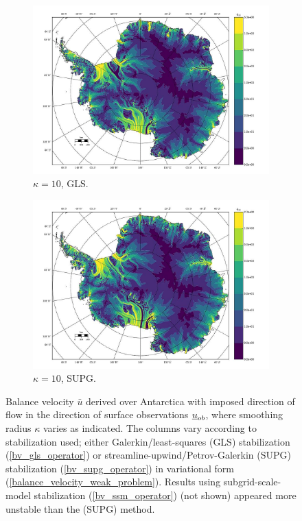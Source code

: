 \begin{figure}
  \begin{subfigure}[b]{0.45\linewidth}
    \includegraphics[width=\linewidth]{images/balance_velocity/antarctica/d_U_ob/Ubar_10H_kappa_10_GLS.jpg}
  \caption{$\kappa = 10$, GLS.}
  \label{antarctica_bv_image_d_U_ob_kappa_10_GLS}
  \end{subfigure}
  \begin{subfigure}[b]{0.45\linewidth}
    \includegraphics[width=\linewidth]{images/balance_velocity/antarctica/d_U_ob/Ubar_10H_kappa_10_SUPG.jpg}
  \caption{$\kappa = 10$, SUPG.}
  \label{antarctica_bv_image_d_U_ob_kappa_10_SUPG}
  \end{subfigure}
  
  \caption[Antarctica balance-velocity with $\mathbf{d}^{\text{data}} = \mathbf{u}_{ob}$.]{Balance velocity $\bar{u}$ derived over Antarctica with imposed direction of flow in the direction of surface observations $\underline{u}_{ob}$, where smoothing radius $\kappa$ varies as indicated.  The columns vary according to stabilization used; either Galerkin/least-squares (GLS) stabilization (\ref{bv_gls_operator}) or streamline-upwind/Petrov-Galerkin (SUPG) stabilization (\ref{bv_supg_operator}) in variational form (\ref{balance_velocity_weak_problem}).  Results using subgrid-scale-model stabilization (\ref{bv_ssm_operator}) (not shown) appeared more unstable than the (SUPG) method. \newline \newline}


\end{figure}
